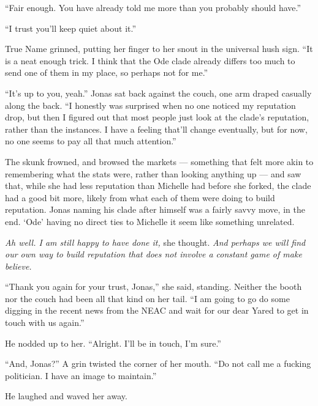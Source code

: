 ``Fair enough. You have already told me more than you probably should have.''

``I trust you'll keep quiet about it.''

True Name grinned, putting her finger to her snout in the universal hush sign. ``It is a neat enough trick. I think that the Ode clade already differs too much to send one of them in my place, so perhaps not for me.''

``It's up to you, yeah.'' Jonas sat back against the couch, one arm draped casually along the back. ``I honestly was surprised when no one noticed my reputation drop, but then I figured out that most people just look at the clade's reputation, rather than the instances. I have a feeling that'll change eventually, but for now, no one seems to pay all that much attention.''

The skunk frowned, and browsed the markets — something that felt more akin to remembering what the stats were, rather than looking anything up — and saw that, while she had less reputation than Michelle had before she forked, the clade had a good bit more, likely from what each of them were doing to build reputation. Jonas naming his clade after himself was a fairly savvy move, in the end. `Ode' having no direct ties to Michelle it seem like something unrelated.

\emph{Ah well. I am still happy to have done it,} she thought. \emph{And perhaps we will find our own way to build reputation that does not involve a constant game of make believe.}

``Thank you again for your trust, Jonas,'' she said, standing. Neither the booth nor the couch had been all that kind on her tail. ``I am going to go do some digging in the recent news from the NEAC and wait for our dear Yared to get in touch with us again.''

He nodded up to her. ``Alright. I'll be in touch, I'm sure.''

``And, Jonas?'' A grin twisted the corner of her mouth. ``Do not call me a fucking politician. I have an image to maintain.''

He laughed and waved her away.
